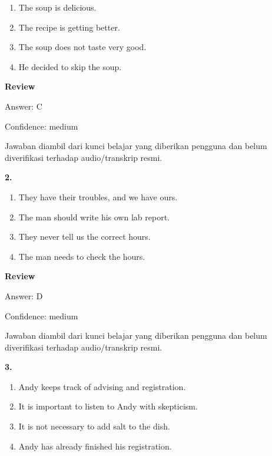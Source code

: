 \documentclass[12pt]{article}
\begin{document}
\begin{enumerate}[label=(\Alph*),leftmargin=*,itemsep=0.2em]
\item The soup is delicious.
\item The recipe is getting better.
\item The soup does not taste very good.
\item He decided to skip the soup.
\end{enumerate}
\par
\begingroup
\setlength{\parskip}{0pt}
\setlength{\parindent}{0pt}
\textbf{Review}\par
Answer: C\par
Confidence: medium\par
Jawaban diambil dari kunci belajar yang diberikan pengguna dan belum diverifikasi terhadap audio/transkrip resmi.\par
\endgroup
\par
\vspace{0.25\baselineskip}
\noindent\textbf{2.}
\begin{enumerate}[label=(\Alph*),leftmargin=*,itemsep=0.2em]
\item They have their troubles, and we have ours.
\item The man should write his own lab report.
\item They never tell us the correct hours.
\item The man needs to check the hours.
\end{enumerate}
\par
\begingroup
\setlength{\parskip}{0pt}
\setlength{\parindent}{0pt}
\textbf{Review}\par
Answer: D\par
Confidence: medium\par
Jawaban diambil dari kunci belajar yang diberikan pengguna dan belum diverifikasi terhadap audio/transkrip resmi.\par
\endgroup
\par
\vspace{0.25\baselineskip}
\noindent\textbf{3.}
\begin{enumerate}[label=(\Alph*),leftmargin=*,itemsep=0.2em]
\item Andy keeps track of advising and registration.
\item It is important to listen to Andy with skepticism.
\item It is not necessary to add salt to the dish.
\item Andy has already finished his registration.
\end{enumerate}
\end{document}
